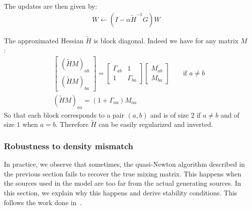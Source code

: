 The updates are then given by:
\begin{align}
  W \leftarrow (I - \alpha \tilde{H}^{-1} G) W
\end{align}

The approximated Hessian $\tilde{H}$ is block diagonal.
Indeed we have for any matrix $M$:
\begin{align}
  &\begin{bmatrix} (\tilde{H} M)_{ab} \\  (\tilde{H} M)_{ba} \end{bmatrix} = \begin{bmatrix} \Gamma_{ab} & 1 \\ 1 & \Gamma_{ba} \end{bmatrix} \begin{bmatrix} M_{ab} \\ M_{ba} \end{bmatrix} && \text{ if } a \neq b  \nonumber \\
  &(\tilde{H} M)_{aa} =  (1 + \Gamma_{aa}) M_{aa}
 \label{eq:apphess:blocks}
\end{align}
So that each block corresponds to a pair $(a, b)$ and is of size $2$ if $a \neq b$ and of size $1$ when $a=b$.
Therefore $\tilde{H}$ can be easily regularized and inverted.

\subsubsection{Robustness to density mismatch}
In practice, we observe that sometimes, the quasi-Newton algorithm described in
the previous section fails to recover the true mixing matrix. This happens when the
sources used in the model are too far from the actual  generating sources.
%
In this section, we explain
why this happens and derive stability conditions. This follows the work done in~\cite{cardoso1998blind}.

